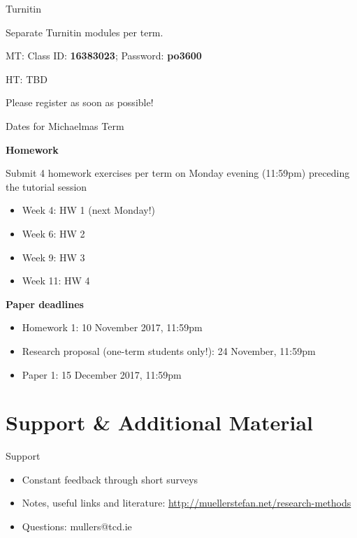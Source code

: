 \documentclass[10pt]{beamer}
\begin{document}
\begin{frame}{Turnitin}

Separate Turnitin modules per term.

MT: Class ID: \textbf{16383023}; Password: \textbf{po3600}

HT: TBD

Please register as soon as possible!
\end{frame}

\begin{frame}{Dates for Michaelmas Term}

\textbf{Homework}

Submit 4 homework exercises per term on Monday evening (11:59pm) preceding the tutorial session

\begin{itemize}
\item Week 4: HW 1 (next Monday!)
\item Week 6: HW 2
\item Week 9: HW 3
\item Week 11: HW 4
\end{itemize}

\textbf{Paper deadlines}

\begin{itemize}
\item Homework 1: 10 November 2017, 11:59pm
\item Research proposal (one-term students only!): 24 November, 11:59pm
\item Paper 1: 15 December 2017, 11:59pm
\end{itemize}

\end{frame}

\section{Support \& Additional Material}

\begin{frame}{Support}

\begin{itemize}
\item Constant feedback through short surveys%
\item Notes, useful links and literature: \url{http://muellerstefan.net/research-methods}
\item Questions: mullers@tcd.ie
\end{itemize}

\end{frame}
\end{document}

